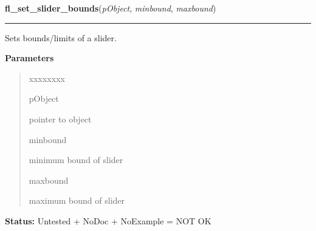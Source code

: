 \hspace{.8\funcindent}\begin{boxedminipage}{\funcwidth}

    \raggedright \textbf{fl\_set\_slider\_bounds}(\textit{pObject}, \textit{minbound}, \textit{maxbound})

    \vspace{-1.5ex}

    \rule{\textwidth}{0.5\fboxrule}
\setlength{\parskip}{2ex}
    Sets bounds/limits of a slider.

\setlength{\parskip}{1ex}
      \textbf{Parameters}
      \vspace{-1ex}

      \begin{quote}
        \begin{Ventry}{xxxxxxxx}

          \item[pObject]

          pointer to object

          \item[minbound]

          minimum bound of slider

          \item[maxbound]

          maximum bound of slider

        \end{Ventry}

      \end{quote}

\textbf{Status:} Untested + NoDoc + NoExample = NOT OK



    \end{boxedminipage}

    \label{xformslib:library:fl_get_slider_bounds}

    \vspace{0.5ex}

